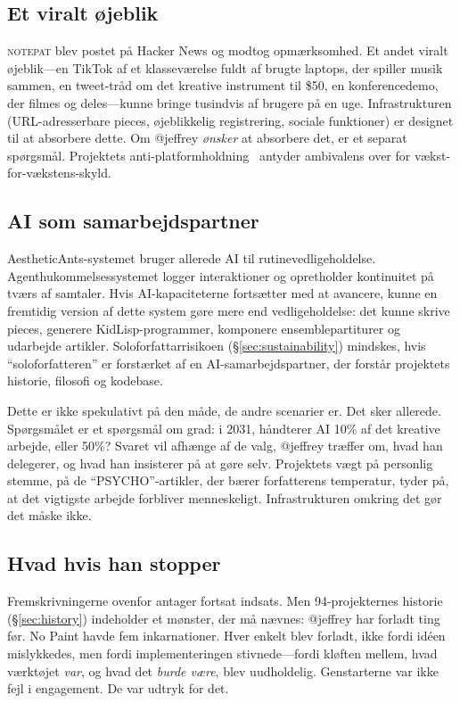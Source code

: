 \documentclass[10pt,letterpaper,twocolumn]{article}
\newcommand{\np}{\textsc{notepat}}
\begin{document}
\subsection{Et viralt øjeblik}

\np{} blev postet på Hacker News og modtog opmærksomhed. Et andet viralt øjeblik---en TikTok af et klasseværelse fuldt af brugte laptops, der spiller musik sammen, en tweet-tråd om det kreative instrument til \$50, en konferencedemo, der filmes og deles---kunne bringe tusindvis af brugere på en uge. Infrastrukturen (URL-adresserbare pieces, øjeblikkelig registrering, sociale funktioner) er designet til at absorbere dette. Om @jeffrey \emph{ønsker} at absorbere det, er et separat spørgsmål. Projektets anti-platformholdning~\citep{fisher2009capitalist} antyder ambivalens over for vækst-for-vækstens-skyld.

\subsection{AI som samarbejdspartner}

AestheticAnts-systemet bruger allerede AI til rutinevedligeholdelse. Agenthukommelsessystemet logger interaktioner og opretholder kontinuitet på tværs af samtaler. Hvis AI-kapaciteterne fortsætter med at avancere, kunne en fremtidig version af dette system gøre mere end vedligeholdelse: det kunne skrive pieces, generere KidLisp-programmer, komponere ensemblepartiturer og udarbejde artikler. Soloforfattarrisikoen (\S\ref{sec:sustainability}) mindskes, hvis ``soloforfatteren'' er forstærket af en AI-samarbejdspartner, der forstår projektets historie, filosofi og kodebase.

Dette er ikke spekulativt på den måde, de andre scenarier er. Det sker allerede. Spørgsmålet er et spørgsmål om grad: i 2031, håndterer AI 10\% af det kreative arbejde, eller 50\%? Svaret vil afhænge af de valg, @jeffrey træffer om, hvad han delegerer, og hvad han insisterer på at gøre selv. Projektets vægt på personlig stemme, på de ``PSYCHO''-artikler, der bærer forfatterens temperatur, tyder på, at det vigtigste arbejde forbliver menneskeligt. Infrastrukturen omkring det gør det måske ikke.

\subsection{Hvad hvis han stopper}
\label{sec:giveup}

Fremskrivningerne ovenfor antager fortsat indsats. Men 94-projekternes historie (\S\ref{sec:history}) indeholder et mønster, der må nævnes: @jeffrey har forladt ting før. No Paint havde fem inkarnationer. Hver enkelt blev forladt, ikke fordi idéen mislykkedes, men fordi implementeringen stivnede---fordi kløften mellem, hvad værktøjet \emph{var}, og hvad det \emph{burde være}, blev uudholdelig. Genstarterne var ikke fejl i engagement. De var udtryk for det.
\end{document}
